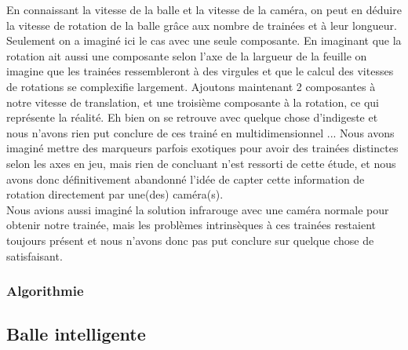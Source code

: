 En connaissant la vitesse de la balle et la vitesse de la caméra, on peut en déduire la vitesse de rotation de la balle grâce aux nombre de trainées et à leur longueur. Seulement on a imaginé ici le cas avec une seule composante. En imaginant que la rotation ait aussi une composante selon l'axe de la largueur de la feuille on imagine que les trainées ressembleront à des virgules et que le calcul des vitesses de rotations se complexifie largement. Ajoutons maintenant 2 composantes à notre vitesse de translation, et une troisième composante à la rotation, ce qui représente la réalité. Eh bien on se retrouve avec quelque chose d'indigeste et nous n'avons rien put conclure de ces trainé en multidimensionnel ... Nous avons imaginé mettre des marqueurs parfois exotiques pour avoir des trainées distinctes selon les axes en jeu, mais rien de concluant n'est ressorti de cette étude, et nous avons donc définitivement abandonné l'idée de capter cette information de rotation directement par une(des) caméra(s).\\

Nous avions aussi imaginé la solution infrarouge avec une caméra normale pour obtenir notre trainée, mais les problèmes intrinsèques à ces trainées restaient toujours présent et nous n'avons donc pas put conclure sur quelque chose de satisfaisant.\\

\subsubsection{Algorithmie}


\subsection{Balle intelligente}

